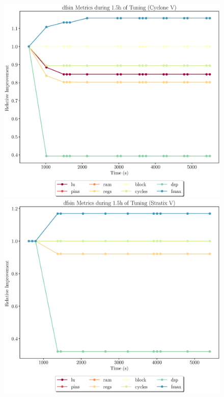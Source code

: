 \documentclass[12pt, a4paper]{article}
\begin{document}
\begin{figure}[htpb]
    \begin{minipage}{.48\textwidth}
        \includegraphics[scale=.29]{dfsin_all_5400_chstone_CycloneV}
    \end{minipage}%
    \hfill
    \begin{minipage}{.48\textwidth}
        \includegraphics[scale=.29]{dfsin_all_5400_chstone_StratixV}
    \end{minipage}%


\end{figure}
\end{document}
